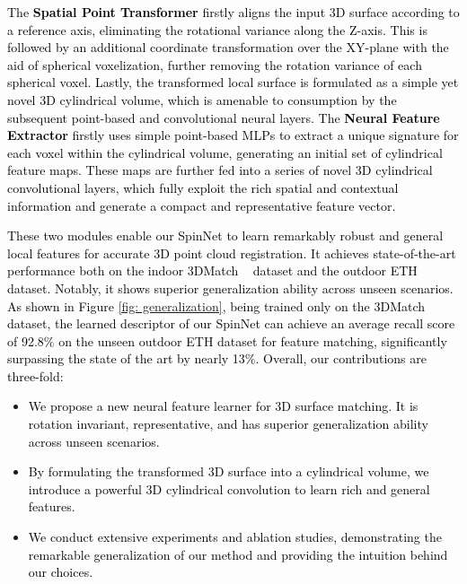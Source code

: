 \documentclass[final]{cvpr}
\newcommand{\qy}[1]{\textcolor{black}{#1}}
\newcommand{\bo}[1]{\textcolor{black}{#1}}
\newcommand{\nickname}{SpinNet}
\begin{document}
\bo{The \textbf{Spatial Point Transformer} firstly aligns the input 3D surface according to a reference axis, eliminating the rotational variance along the Z-axis. This is followed by an additional coordinate transformation over the XY-plane with the aid of spherical voxelization, further removing the rotation variance of each spherical voxel. Lastly, the transformed local surface is formulated as a simple yet novel 3D cylindrical volume, which is amenable to consumption by the subsequent point-based and convolutional neural layers. The \textbf{Neural Feature Extractor} firstly uses simple point-based MLPs to extract a unique signature for each voxel within the cylindrical volume, generating an initial set of cylindrical feature maps. These maps are further fed into a series of novel 3D cylindrical convolutional layers, which fully exploit the rich spatial and contextual information and generate a compact and representative feature vector.}


\qy{
\bo{These two modules enable our \nickname{} to learn remarkably robust and general local features for accurate 3D point cloud registration.}
It achieves state-of-the-art performance both on the indoor 3DMatch ~\cite{Zeng2017} dataset and the outdoor ETH \cite{pomerleau2012challenging} dataset. Notably, it shows superior generalization ability across unseen scenarios. As shown in Figure \ref{fig: generalization}, being trained only on the 3DMatch dataset, the learned descriptor of our \nickname{} can achieve an average recall score of 92.8\% on the unseen outdoor ETH dataset for feature matching, significantly surpassing the state of the art by nearly 13\%. Overall, our contributions are three-fold:
}
\begin{itemize}[leftmargin=*]
\setlength{\itemsep}{0pt}
\setlength{\parsep}{0pt}
\setlength{\parskip}{0pt}
\item \qy{We propose a new neural feature learner for 3D surface matching. It is rotation invariant, representative, and has superior generalization ability across unseen scenarios.}
\item \qy{By formulating the transformed 3D surface into a cylindrical volume,  
we introduce a powerful 3D cylindrical convolution to learn rich and general features.}
\item \qy{We conduct extensive experiments and ablation studies, demonstrating the remarkable generalization of our method and providing the intuition behind our choices.}
\end{itemize}
\end{document}
